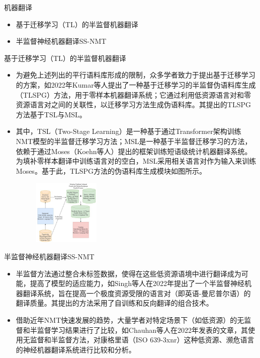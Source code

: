 \documentclass[UTF8]{beamer}
\begin{document}
\begin{frame}{机器翻译}
    \begin{itemize}
        \item 基于迁移学习（TL）的半监督机器翻译
        \item 半监督神经机器翻译SS-NMT
    \end{itemize}
\end{frame}

\begin{frame}{基于迁移学习（TL）的半监督机器翻译}
    \scriptsize
    \begin{itemize}
        \item 为避免上述列出的平行语料库形成的限制，众多学者致力于提出基于迁移学习的方案，如2022年Kumar等人提出了一种基于迁移学习的半监督伪语料库生成（TLSPG）方法，用于零样本机器翻译系统；它通过利用低资源语言对和零资源语言对之间的关联性，以迁移学习方法生成伪语料库。其提出的TLSPG方法基于TSL与MSL。
        \item 其中，TSL（Two-Stage Learning）是一种基于通过Transformer架构训练NMT模型的半监督迁移学习方法；MSL是一种基于半监督迁移学习的方法，依赖于通过Moses（Koehn等人）提出的框架训练短语级统计机器翻译系统。为填补零样本翻译中训练语言对的空白，MSL采用相关语言对作为输入来训练Moses。基于此，TLSPG方法的伪语料库生成模块如图所示。

        \begin{figure}[H]
            \centering
            \includegraphics[width=0.3\textwidth]{img/3-Language Translation/13.png}
        \end{figure}
    \end{itemize}
\end{frame}

\begin{frame}{半监督神经机器翻译SS-NMT}
    \begin{itemize}
        \item 半监督方法通过整合未标签数据，使得在这些低资源语境中进行翻译成为可能，提高了模型的适应能力，如Singh等人在2022年提出了一个半监督神经机器翻译系统，旨在提高一个极度资源受限的语言对（即英语-曼尼普尔语）的翻译质量。其提出的方法采用了自训练和反向翻译的组合技术。
        \item 借助近年NMT快速发展的趋势，大量学者对特定场景下（如低资源）的无监督和半监督学习结果进行了比较，如Chauhan等人在2022年发表的文章，其使用无监督和半监督方法，对康格里语（ISO 639-3xnr）这种低资源、濒危语言的神经机器翻译系统进行比较和分析。
    \end{itemize}
\end{frame}
\end{document}
